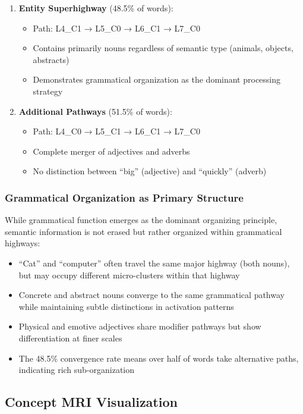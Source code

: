 \begin{enumerate}
    \item \textbf{Entity Superhighway} (48.5\% of words):
    \begin{itemize}
        \item Path: L4\_C1 → L5\_C0 → L6\_C1 → L7\_C0
        \item Contains primarily nouns regardless of semantic type (animals, objects, abstracts)
        \item Demonstrates grammatical organization as the dominant processing strategy
    \end{itemize}
    
    \item \textbf{Additional Pathways} (51.5\% of words):
    \begin{itemize}
        \item Path: L4\_C0 → L5\_C1 → L6\_C1 → L7\_C0
        \item Complete merger of adjectives and adverbs
        \item No distinction between ``big'' (adjective) and ``quickly'' (adverb)
    \end{itemize}
\end{enumerate}

\subsubsection{Grammatical Organization as Primary Structure}

While grammatical function emerges as the dominant organizing principle, semantic information is not erased but rather organized within grammatical highways:
\begin{itemize}
    \item ``Cat'' and ``computer'' often travel the same major highway (both nouns), but may occupy different micro-clusters within that highway
    \item Concrete and abstract nouns converge to the same grammatical pathway while maintaining subtle distinctions in activation patterns
    \item Physical and emotive adjectives share modifier pathways but show differentiation at finer scales
    \item The 48.5\% convergence rate means over half of words take alternative paths, indicating rich sub-organization
\end{itemize}

\subsection{Concept MRI Visualization}


